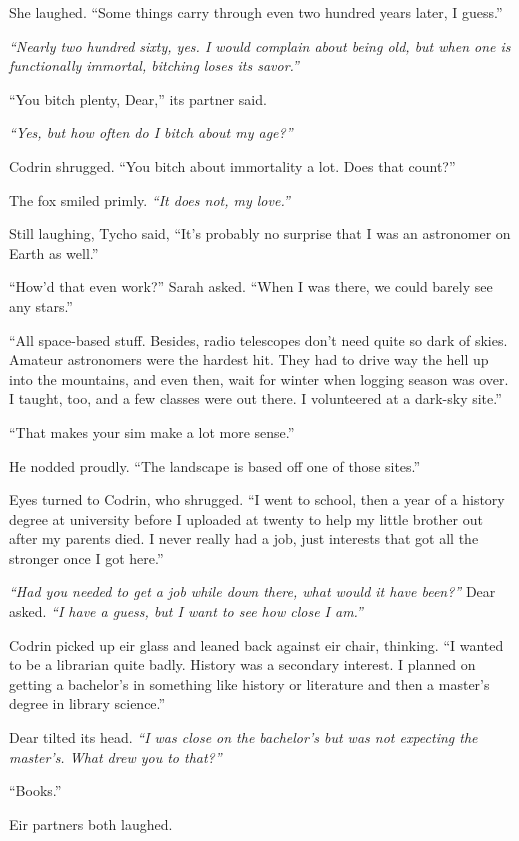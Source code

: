 She laughed. ``Some things carry through even two hundred years later, I guess.''

\emph{``Nearly two hundred sixty, yes. I would complain about being old, but when one is functionally immortal, bitching loses its savor.''}

``You bitch plenty, Dear,'' its partner said.

\emph{``Yes, but how often do I bitch about my age?''}

Codrin shrugged. ``You bitch about immortality a lot. Does that count?''

The fox smiled primly. \emph{``It does not, my love.''}

Still laughing, Tycho said, ``It's probably no surprise that I was an astronomer on Earth as well.''

``How'd that even work?'' Sarah asked. ``When I was there, we could barely see any stars.''

``All space-based stuff. Besides, radio telescopes don't need quite so dark of skies. Amateur astronomers were the hardest hit. They had to drive way the hell up into the mountains, and even then, wait for winter when logging season was over. I taught, too, and a few classes were out there. I volunteered at a dark-sky site.''

``That makes your sim make a lot more sense.''

He nodded proudly. ``The landscape is based off one of those sites.''

Eyes turned to Codrin, who shrugged. ``I went to school, then a year of a history degree at university before I uploaded at twenty to help my little brother out after my parents died. I never really had a job, just interests that got all the stronger once I got here.''

\emph{``Had you needed to get a job while down there, what would it have been?''} Dear asked. \emph{``I have a guess, but I want to see how close I am.''}

Codrin picked up eir glass and leaned back against eir chair, thinking. ``I wanted to be a librarian quite badly. History was a secondary interest. I planned on getting a bachelor's in something like history or literature and then a master's degree in library science.''

Dear tilted its head. \emph{``I was close on the bachelor's but was not expecting the master's. What drew you to that?''}

``Books.''

Eir partners both laughed.

